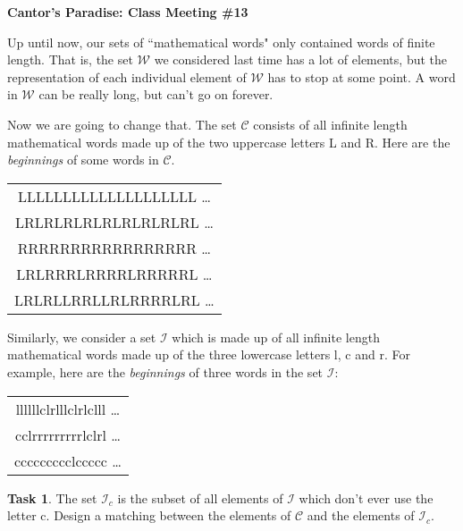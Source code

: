 \documentclass[12pt]{amsart}
\theoremstyle{definition}
\newtheorem{task}{Task}
\begin{document}
\begin{center}
\textbf{\Huge
Cantor's Paradise: Class Meeting \#13
}
\end{center}

\vspace{.5in}


Up until now, our sets of ``mathematical words" only contained words of finite length. That is, the set $\mathcal{W}$ we considered last time has a lot of elements, but the representation of each individual element of $\mathcal{W}$ has to stop at some point. A word in $\mathcal{W}$ can be really long, but can't go on forever.

Now we are going to change that. The set $\mathcal{C}$ consists of all infinite length mathematical words made up of the two uppercase letters L and R. Here are the \emph{beginnings} of some words in $\mathcal{C}$.

\begin{center}
\begin{tabular}{c}
LLLLLLLLLLLLLLLLLLLL \dots \\[.2cm]
LRLRLRLRLRLRLRLRLRL \dots \\[.2cm]
RRRRRRRRRRRRRRRRR \dots \\[.2cm]
LRLRRRLRRRRLRRRRRL \dots \\[.2cm]
LRLRLLRRLLRLRRRRLRL \dots\\[.5cm]
\end{tabular}
\end{center}
Similarly, we consider a set $\mathcal{I}$ which is made up of all infinite length mathematical words made up of the three lowercase letters l, c and r. For example, here are the \emph{beginnings} of three words in the set $\mathcal{I}$:

\begin{center}
\begin{tabular}{c}
llllllclrlllclrlclll \dots \\[.2cm]
cclrrrrrrrrrlclrl \dots \\[.2cm]
ccccccccclccccc \dots \\[.5cm]
\end{tabular}
\end{center}


\begin{task}
The set $\mathcal{I}_c$ is the subset of all elements of $\mathcal{I}$ which don't ever use the letter c. Design a matching between the elements of $\mathcal{C}$ and the elements of $\mathcal{I}_c$.
\end{task}
\end{document}
